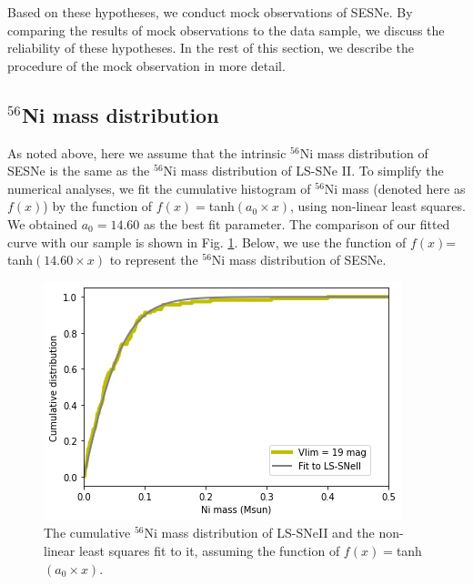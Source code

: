\documentclass[twocolumn, linenumbers]{aastex62}
\begin{document}
Based on these hypotheses, we conduct mock observations of SESNe.
By comparing the results of mock observations to the data sample, we discuss the reliability of these hypotheses. In the rest of this section, we describe the procedure of the mock observation in more detail.

\subsection{$^{56}$Ni mass distribution} \label{sec:ni_dist}
As noted above, here we assume that the intrinsic $^{56}$Ni mass distribution of SESNe is the same as the $^{56}$Ni mass distribution of LS-SNe II.
To simplify the numerical analyses, we fit the cumulative histogram of $^{56}$Ni mass (denoted here as $f(x)$) by the function of $f(x) =$tanh$(a_0 \times x)$, using non-linear least squares. We obtained $a_0= 14.60$ as the best fit parameter. The comparison of our fitted curve with our sample is shown in Fig. \ref{fit_data}. Below, we use the function of $f(x)$= tanh$(14.60 \times x)$ to represent the $^{56}$Ni mass distribution of SESNe. 

\begin{figure}
	\includegraphics[width=\columnwidth]{Ni_fit.png}
    \caption{The cumulative $^{56}$Ni mass distribution of LS-SNeII
    and the non-linear least squares fit to it, assuming the function of $f(x)= $tanh$(a_0 \times x)$.}
     \label{fit_data}
\end{figure}
\end{document}
